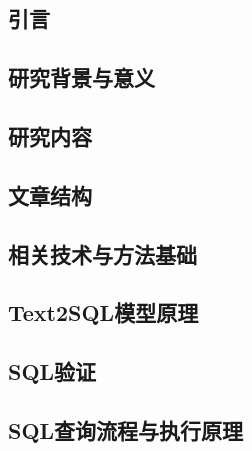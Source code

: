 \documentclass[10.5pt,compsoc,twocolumn]{CjC} %
\theoremstyle{mystyle}
\begin{document}
{\begin{CJK*}{UTF8}{zhhei}\vskip 1mm\section{引言}\end{CJK*}}
{\begin{CJK*}{UTF8}{zhhei}\vskip 1mm\subsection{研究背景与意义}\end{CJK*}}

{\begin{CJK*}{UTF8}{zhhei}\vskip 1mm\subsection{研究内容}\end{CJK*}}

{\begin{CJK*}{UTF8}{zhhei}\vskip 1mm\subsection{文章结构}\end{CJK*}}

{\begin{CJK*}{UTF8}{zhhei}\vskip 1mm\section{相关技术与方法基础}\end{CJK*}}
{\begin{CJK*}{UTF8}{zhhei}\subsection{Text2SQL模型原理}\end{CJK*}}

{\begin{CJK*}{UTF8}{zhhei}\vskip 1mm\subsection{SQL验证}\end{CJK*}}

{\begin{CJK*}{UTF8}{zhhei}\vskip 1mm\subsection{SQL查询流程与执行原理}\end{CJK*}}
\end{document}
